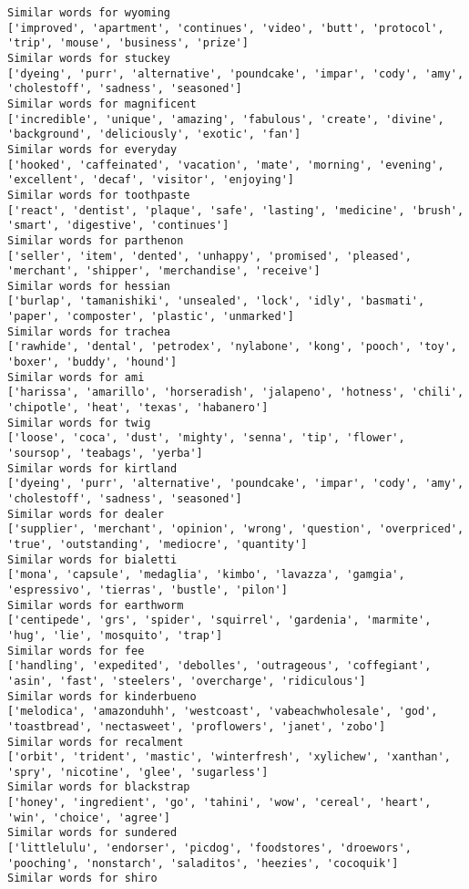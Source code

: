 \documentclass[11pt]{article}
\begin{document}
\begin{Verbatim}[commandchars=\\\{\}]
Similar words for wyoming
['improved', 'apartment', 'continues', 'video', 'butt', 'protocol', 'trip', 'mouse', 'business', 'prize']
Similar words for stuckey
['dyeing', 'purr', 'alternative', 'poundcake', 'impar', 'cody', 'amy', 'cholestoff', 'sadness', 'seasoned']
Similar words for magnificent
['incredible', 'unique', 'amazing', 'fabulous', 'create', 'divine', 'background', 'deliciously', 'exotic', 'fan']
Similar words for everyday
['hooked', 'caffeinated', 'vacation', 'mate', 'morning', 'evening', 'excellent', 'decaf', 'visitor', 'enjoying']
Similar words for toothpaste
['react', 'dentist', 'plaque', 'safe', 'lasting', 'medicine', 'brush', 'smart', 'digestive', 'continues']
Similar words for parthenon
['seller', 'item', 'dented', 'unhappy', 'promised', 'pleased', 'merchant', 'shipper', 'merchandise', 'receive']
Similar words for hessian
['burlap', 'tamanishiki', 'unsealed', 'lock', 'idly', 'basmati', 'paper', 'composter', 'plastic', 'unmarked']
Similar words for trachea
['rawhide', 'dental', 'petrodex', 'nylabone', 'kong', 'pooch', 'toy', 'boxer', 'buddy', 'hound']
Similar words for ami
['harissa', 'amarillo', 'horseradish', 'jalapeno', 'hotness', 'chili', 'chipotle', 'heat', 'texas', 'habanero']
Similar words for twig
['loose', 'coca', 'dust', 'mighty', 'senna', 'tip', 'flower', 'soursop', 'teabags', 'yerba']
Similar words for kirtland
['dyeing', 'purr', 'alternative', 'poundcake', 'impar', 'cody', 'amy', 'cholestoff', 'sadness', 'seasoned']
Similar words for dealer
['supplier', 'merchant', 'opinion', 'wrong', 'question', 'overpriced', 'true', 'outstanding', 'mediocre', 'quantity']
Similar words for bialetti
['mona', 'capsule', 'medaglia', 'kimbo', 'lavazza', 'gamgia', 'espressivo', 'tierras', 'bustle', 'pilon']
Similar words for earthworm
['centipede', 'grs', 'spider', 'squirrel', 'gardenia', 'marmite', 'hug', 'lie', 'mosquito', 'trap']
Similar words for fee
['handling', 'expedited', 'debolles', 'outrageous', 'coffegiant', 'asin', 'fast', 'steelers', 'overcharge', 'ridiculous']
Similar words for kinderbueno
['melodica', 'amazonduhh', 'westcoast', 'vabeachwholesale', 'god', 'toastbread', 'nectasweet', 'proflowers', 'janet', 'zobo']
Similar words for recalment
['orbit', 'trident', 'mastic', 'winterfresh', 'xylichew', 'xanthan', 'spry', 'nicotine', 'glee', 'sugarless']
Similar words for blackstrap
['honey', 'ingredient', 'go', 'tahini', 'wow', 'cereal', 'heart', 'win', 'choice', 'agree']
Similar words for sundered
['littlelulu', 'endorser', 'picdog', 'foodstores', 'droewors', 'pooching', 'nonstarch', 'saladitos', 'heezies', 'cocoquik']
Similar words for shiro

\end{Verbatim}
\end{document}
